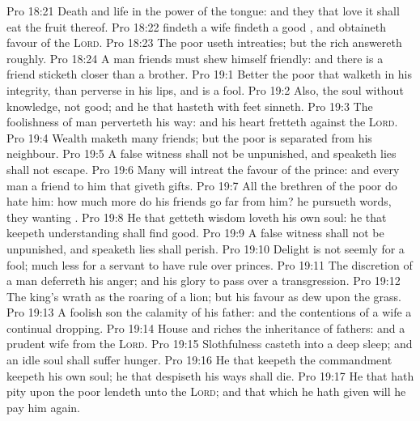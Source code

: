 \vs Pro 18:21 Death and life  in the power of the tongue: and they that love it shall eat the fruit thereof.
\vs Pro 18:22  findeth a wife findeth a good , and obtaineth favour of the \textsc{Lord}.
\vs Pro 18:23 The poor useth intreaties; but the rich answereth roughly.
\vs Pro 18:24 A man  friends must shew himself friendly: and there is a friend  sticketh closer than a brother.
\vs Pro 19:1 Better  the poor that walketh in his integrity, than  perverse in his lips, and is a fool.
\vs Pro 19:2 Also,  the soul  without knowledge,  not good; and he that hasteth with  feet sinneth.
\vs Pro 19:3 The foolishness of man perverteth his way: and his heart fretteth against the \textsc{Lord}.
\vs Pro 19:4 Wealth maketh many friends; but the poor is separated from his neighbour.
\vs Pro 19:5 A false witness shall not be unpunished, and  speaketh lies shall not escape.
\vs Pro 19:6 Many will intreat the favour of the prince: and every man  a friend to him that giveth gifts.
\vs Pro 19:7 All the brethren of the poor do hate him: how much more do his friends go far from him? he pursueth  words,  they  wanting .
\vs Pro 19:8 He that getteth wisdom loveth his own soul: he that keepeth understanding shall find good.
\vs Pro 19:9 A false witness shall not be unpunished, and  speaketh lies shall perish.
\vs Pro 19:10 Delight is not seemly for a fool; much less for a servant to have rule over princes.
\vs Pro 19:11 The discretion of a man deferreth his anger; and  his glory to pass over a transgression.
\vs Pro 19:12 The king's wrath  as the roaring of a lion; but his favour  as dew upon the grass.
\vs Pro 19:13 A foolish son  the calamity of his father: and the contentions of a wife  a continual dropping.
\vs Pro 19:14 House and riches  the inheritance of fathers: and a prudent wife  from the \textsc{Lord}.
\vs Pro 19:15 Slothfulness casteth into a deep sleep; and an idle soul shall suffer hunger.
\vs Pro 19:16 He that keepeth the commandment keepeth his own soul;  he that despiseth his ways shall die.
\vs Pro 19:17 He that hath pity upon the poor lendeth unto the \textsc{Lord}; and that which he hath given will he pay him again.
